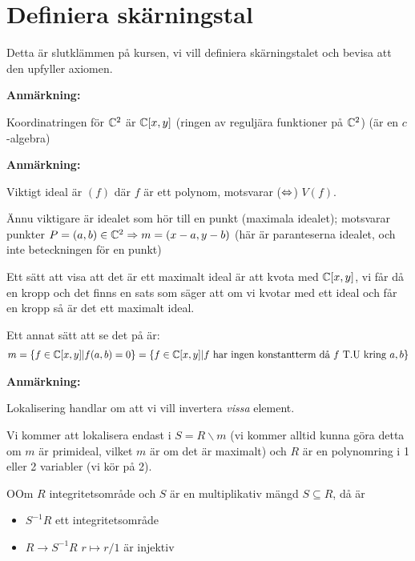 \section{Definiera skärningstal}\par
\noindent Detta är slutklämmen på kursen, vi vill definiera skärningstalet och bevisa att den upfyller axiomen.
\par\bigskip
\noindent\textbf{Anmärkning:}\par
\noindent Koordinatringen för $\mathbb{C}^2$ är $\mathbb{C}[x,y]$ (ringen av reguljära funktioner på $\mathbb{C}^2$) (är en $c$-algebra)
\par\bigskip
\noindent\textbf{Anmärkning:}\par
\noindent Viktigt ideal är $(f)$ där $f$ är ett polynom, motsvarar ($\Leftrightarrow$) $V(f)$.\par
\noindent Ännu viktigare är idealet som hör till en punkt (maximala idealet); motsvarar punkter $P=(a,b)\in\mathbb{C}^2\Rightarrow m = (x-a,y-b)$ (här är paranteserna idealet, och inte beteckningen för en punkt)\par
\noindent Ett sätt att visa att det är ett maximalt ideal är att kvota med $\mathbb{C}[x,y]$, vi får då en kropp och det finns en sats som säger att om vi kvotar med ett ideal och får en kropp så är det ett maximalt ideal.\par
\noindent Ett annat sätt att se det på är:
\begin{equation*}
  \begin{gathered}
    m = \left\{f\in\mathbb{C}[x,y]|f(a,b) = 0\right\} = \left\{f\in\mathbb{C}[x,y]|\text{$f$ har ingen konstantterm då $f$ T.U kring $a,b$}\right\}
  \end{gathered}
\end{equation*}
\par\bigskip
\noindent\textbf{Anmärkning:}\par
\noindent Lokalisering handlar om att vi vill invertera \textit{vissa} element.
\par\bigskip
\noindent Vi kommer att lokalisera endast i $S = R\backslash m$ (vi kommer alltid kunna göra detta om $m$ är primideal, vilket $m$ är om det är maximalt) och $R$ är en polynomring i 1 eller 2 variabler (vi kör på 2).
\par\bigskip
\begin{theo}
  OOm $R$ integritetsområde och $S$ är en multiplikativ mängd $S\subseteq R$, då är\par
  \begin{itemize}
    \item $S^{-1}R$ ett integritetsområde
    \item $R\to S^{-1}R$ $r\mapsto r/1$ är injektiv
  \end{itemize}
\end{theo}
